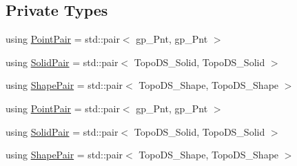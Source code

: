 \subsection*{Private Types}
\begin{DoxyCompactItemize}
\item 
using \hyperlink{classMcCAD_1_1Decomposition_1_1SolidSplitter_af1bd2cdc22fc3e59277ea6fd04afc42b}{Point\+Pair} = std\+::pair$<$ gp\+\_\+\+Pnt, gp\+\_\+\+Pnt $>$
\item 
using \hyperlink{classMcCAD_1_1Decomposition_1_1SolidSplitter_a89a95e43f161348b456a72c9acce0826}{Solid\+Pair} = std\+::pair$<$ Topo\+D\+S\+\_\+\+Solid, Topo\+D\+S\+\_\+\+Solid $>$
\item 
using \hyperlink{classMcCAD_1_1Decomposition_1_1SolidSplitter_a6d92618f3790cfc7403c6f421bd66411}{Shape\+Pair} = std\+::pair$<$ Topo\+D\+S\+\_\+\+Shape, Topo\+D\+S\+\_\+\+Shape $>$
\item 
using \hyperlink{classMcCAD_1_1Decomposition_1_1SolidSplitter_af1bd2cdc22fc3e59277ea6fd04afc42b}{Point\+Pair} = std\+::pair$<$ gp\+\_\+\+Pnt, gp\+\_\+\+Pnt $>$
\item 
using \hyperlink{classMcCAD_1_1Decomposition_1_1SolidSplitter_a89a95e43f161348b456a72c9acce0826}{Solid\+Pair} = std\+::pair$<$ Topo\+D\+S\+\_\+\+Solid, Topo\+D\+S\+\_\+\+Solid $>$
\item 
using \hyperlink{classMcCAD_1_1Decomposition_1_1SolidSplitter_a6d92618f3790cfc7403c6f421bd66411}{Shape\+Pair} = std\+::pair$<$ Topo\+D\+S\+\_\+\+Shape, Topo\+D\+S\+\_\+\+Shape $>$
\end{DoxyCompactItemize}
